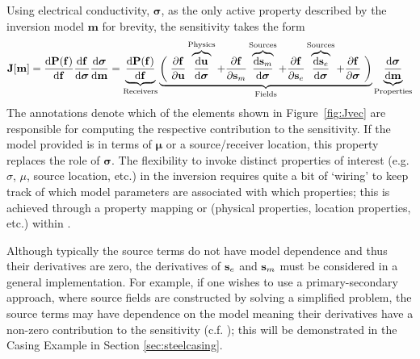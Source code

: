 Using electrical conductivity, $\boldsymbol{\sigma}$, as the only active
property described by the inversion model $\mathbf{m}$ for brevity, the
sensitivity takes the form
\begin{equation}
\mathbf{J}[\mathbf{m}] =
    \frac{\text{d}\mathbf{P}(\mathbf{f})}{\text{d}\mathbf{f}}
    \frac{\text{d}\mathbf{f}}{\text{d}\boldsymbol{\sigma}}
    \frac{\text{d}\boldsymbol{\sigma}}{\text{d}\mathbf{m}}
=
    \underbrace{
    \frac{\text{d}\mathbf{P}(\mathbf{f})}{\text{d}\mathbf{f}}
    }_{\text{Receivers}}
    \underbrace{
    \left(\vphantom{\frac{\partial\mathbf{f}}{\partial\mathbf{u}}} \right.
\frac{\partial\mathbf{f}}{\partial\mathbf{u}} \overbrace{\frac{\text{d}\mathbf{u}}{\text{d}\boldsymbol{\sigma}}}^{\text{Physics}}
        + \frac{\partial\mathbf{f}}{\partial\sm} \overbrace{\frac{\text{d}\sm}{\text{d}\boldsymbol{\sigma}}}^{\text{Sources}}
        + \frac{\partial\mathbf{f}}{\partial\se} \overbrace{\frac{\text{d}\se}{\text{d}\boldsymbol{\sigma}}}^{\text{Sources}}
        + \frac{\partial\mathbf{f}}{\partial\boldsymbol{\sigma}}
    \left. \vphantom{\frac{\partial\mathbf{f}}{\partial\mathbf{u}}}\right)
     }_{\text{Fields}}
    \underbrace{\frac{\text{d}\boldsymbol{\sigma}}{\text{d}\mathbf{m}}}_{\text{Properties}}
    \label{eq:generalsensitivity}
\end{equation}
The annotations denote which of the elements shown in Figure~\ref{fig:Jvec}
are responsible for computing the respective contribution to the sensitivity.
If the model provided is in terms of $\boldsymbol{\mu}$ or a source/receiver
location, this property replaces the role of $\boldsymbol{\sigma}$. The
flexibility to invoke distinct properties of interest (e.g. $\sigma$, $\mu$,
source location, etc.) in the inversion requires quite a bit of `wiring' to
keep track of which model parameters are associated with which properties;
this is achieved through a property mapping or \PropMap (physical properties,
location properties, etc.) within \SimPEG.

Although typically the source terms do not have model dependence and thus
their derivatives are zero, the derivatives of $\mathbf{s}_e$ and $\mathbf{s}_m$ must be
considered in a general implementation. For example, if one wishes to use a
primary-secondary approach, where source fields are constructed by solving a
simplified problem, the source terms may have dependence on the model meaning
their derivatives have a non-zero contribution to the sensitivity (c.f.
\cite{Coggon1971, Haber2014a, Heagy2015}); this will be
demonstrated in the Casing Example in Section \ref{sec:steelcasing}.

